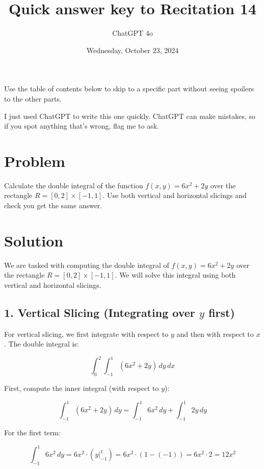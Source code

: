 \documentclass[11pt]{article}
\begin{document}
\title{Quick answer key to Recitation 14}
\author{ChatGPT 4o}
\date{Wednesday, October 23, 2024}
\maketitle

Use the table of contents below to skip to a specific part
without seeing spoilers to the other parts.

I just used ChatGPT to write this one quickly.
ChatGPT can make mistakes, so if you spot anything that's wrong, flag me to ask.

\tableofcontents



\newpage

\section{Problem}
Calculate the double integral of the function \( f(x, y) = 6x^2 + 2y \) over the rectangle \( R = [0, 2] \times [-1, 1] \). Use both vertical and horizontal slicings and check you get the same answer.

\newpage

\section{Solution}

We are tasked with computing the double integral of \( f(x, y) = 6x^2 + 2y \) over the rectangle \( R = [0, 2] \times [-1, 1] \). We will solve this integral using both vertical and horizontal slicings.

\newpage

\subsection{1. Vertical Slicing (Integrating over \(y\) first)}

For vertical slicing, we first integrate with respect to \(y\) and then with respect to \(x\). The double integral is:

\[
\int_0^2 \int_{-1}^1 (6x^2 + 2y) \, dy \, dx
\]

First, compute the inner integral (with respect to \(y\)):

\[
\int_{-1}^1 (6x^2 + 2y) \, dy = \int_{-1}^1 6x^2 \, dy + \int_{-1}^1 2y \, dy
\]

For the first term:

\[
\int_{-1}^1 6x^2 \, dy = 6x^2 \cdot (y \bigg|_{-1}^1) = 6x^2 \cdot (1 - (-1)) = 6x^2 \cdot 2 = 12x^2
\]
\end{document}
